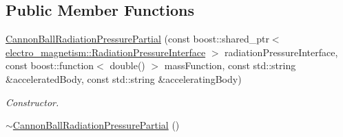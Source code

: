 \subsection*{Public Member Functions}
\begin{DoxyCompactItemize}
\item 
\hyperlink{classtudat_1_1acceleration__partials_1_1CannonBallRadiationPressurePartial_aae08de769beaaee21e7e4c9cc68b9000}{Cannon\+Ball\+Radiation\+Pressure\+Partial} (const boost\+::shared\+\_\+ptr$<$ \hyperlink{classtudat_1_1electro__magnetism_1_1RadiationPressureInterface}{electro\+\_\+magnetism\+::\+Radiation\+Pressure\+Interface} $>$ radiation\+Pressure\+Interface, const boost\+::function$<$ double() $>$ mass\+Function, const std\+::string \&accelerated\+Body, const std\+::string \&accelerating\+Body)
\begin{DoxyCompactList}\small\item\em Constructor. \end{DoxyCompactList}\item 
\hyperlink{classtudat_1_1acceleration__partials_1_1CannonBallRadiationPressurePartial_aaf82430eca086ce0e21ed0c8b0359f24}{$\sim$\+Cannon\+Ball\+Radiation\+Pressure\+Partial} ()\hypertarget{classtudat_1_1acceleration__partials_1_1CannonBallRadiationPressurePartial_aaf82430eca086ce0e21ed0c8b0359f24}{}\label{classtudat_1_1acceleration__partials_1_1CannonBallRadiationPressurePartial_aaf82430eca086ce0e21ed0c8b0359f24}


\end{DoxyCompactItemize}
